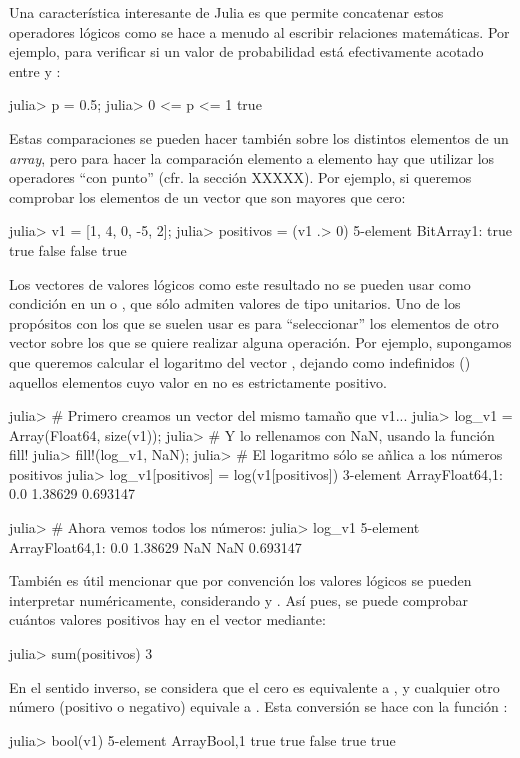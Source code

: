 ﻿\documentclass[spanish]{article}
\begin{document}
Una característica interesante de Julia es que permite concatenar
estos operadores lógicos como se hace a menudo al escribir relaciones
matemáticas. Por ejemplo, para verificar si un valor de probabilidad 
está efectivamente acotado entre  y :

julia> p = 0.5;
julia> 0 <= p <= 1
true

Estas comparaciones se pueden hacer también sobre los distintos elementos
de un \emph{array}, pero para hacer la comparación elemento a elemento
hay que utilizar los operadores ``con punto'' (cfr. la sección XXXXX).
Por ejemplo, si queremos comprobar los elementos de un vector que son mayores que cero:

julia> v1 = [1, 4, 0, -5, 2];
julia> positivos = (v1 .> 0)
5-element BitArray{1}:
  true
  true
 false
 false
  true

Los vectores de valores lógicos como este resultado no se pueden usar como
condición en un  o , que sólo admiten valores de tipo
 unitarios. Uno de los propósitos con los que se suelen usar
es para ``seleccionar'' los elementos de otro vector sobre los que se quiere
realizar alguna operación. Por ejemplo, supongamos que queremos calcular
el logaritmo del vector , dejando como indefinidos ()
aquellos elementos cuyo valor en  no es estrictamente positivo.

julia> # Primero creamos un vector del mismo tamaño que v1...
julia> log_v1 = Array(Float64, size(v1));
julia> # Y lo rellenamos con NaN, usando la función fill!
julia> fill!(log_v1, NaN);
julia> # El logaritmo sólo se añlica a los números positivos
julia> log_v1[positivos] = log(v1[positivos])
3-element Array{Float64,1}:
 0.0
 1.38629
 0.693147

julia> # Ahora vemos todos los números:
julia> log_v1
5-element Array{Float64,1}:
   0.0
   1.38629
 NaN
 NaN
   0.693147

También es útil mencionar que por convención los valores lógicos se pueden
interpretar numéricamente, considerando  y .
Así pues, se puede comprobar cuántos valores positivos hay en el vector 
mediante:

julia> sum(positivos)
3

En el sentido inverso, se considera que el cero es equivalente a ,
y cualquier otro número (positivo o negativo) equivale a . Esta
conversión se hace con la función :

julia> bool(v1)
5-element Array{Bool,1}
  true
  true
 false
  true
  true
\end{document}
